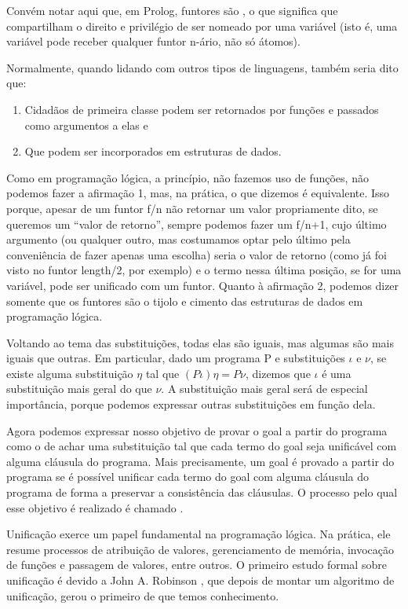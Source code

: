 \documentclass{article}
\begin{document}
  Convém notar aqui que, em Prolog, funtores são , o que significa que compartilham o
  direito e privilégio de ser nomeado por uma variável (isto é, uma variável pode receber qualquer funtor n-ário, não só átomos).

  Normalmente, quando lidando com outros tipos de linguagens, também seria dito que:

  \begin{enumerate}
    \item Cidadãos de primeira classe podem ser retornados por funções e passados como argumentos a elas e
    \item Que podem ser incorporados em estruturas de dados.
  \end{enumerate}

  Como em programação lógica, a princípio, não fazemos uso de funções, não podemos fazer a afirmação 1, mas, na prática, o que dizemos é equivalente.
  Isso porque, apesar de um funtor f/n não retornar um valor propriamente dito, se queremos um ``valor de retorno'', sempre podemos
  fazer um f/n+1, cujo último argumento (ou qualquer outro, mas costumamos optar pelo último pela conveniência de fazer apenas uma
  escolha) seria o valor de retorno (como já foi visto no funtor length/2, por exemplo) e o termo nessa última posição, se for uma variável, pode ser unificado com um funtor. Quanto à afirmação 2, podemos dizer somente que os funtores são o tijolo e cimento das
  estruturas de dados em programação lógica.

Voltando ao tema das substituições, todas elas são iguais, mas algumas são mais iguais que outras. Em particular, dado um programa P e substituições $\iota$ e $\nu$, se existe alguma substituição $\eta$ tal que $(P\iota)\eta = P \nu$, dizemos que $\iota$ é uma substituição mais geral do que $\nu$. A substituição mais geral será de especial importância, porque podemos expressar outras substituições em função dela.

Agora podemos expressar nosso objetivo de provar o goal a partir do programa como o de achar uma substituição tal que cada termo do goal seja unificável com alguma cláusula do programa. Mais precisamente, um goal é provado a partir do programa se é possível unificar cada termo do goal com alguma cláusula do programa de forma a preservar a consistência das cláusulas. O processo pelo qual esse objetivo é realizado é chamado .

Unificação exerce um papel fundamental na programação lógica. Na prática, ele resume processos de atribuição de valores, gerenciamento de memória, invocação de funções e passagem de valores, entre outros. O primeiro estudo formal sobre unificação é devido a John A. Robinson \cite{robinson}, que depois de montar um algoritmo de unificação, gerou o primeiro de que temos conhecimento.
\end{document}
